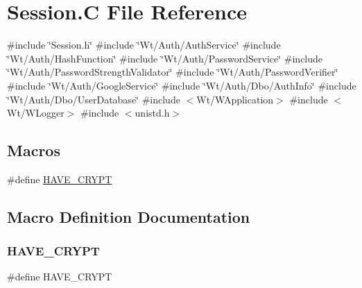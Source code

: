 \hypertarget{_session_8_c}{}\section{Session.\+C File Reference}
\label{_session_8_c}
{\ttfamily \#include \char`\"{}Session.\+h\char`\"{}}\newline
{\ttfamily \#include \char`\"{}Wt/\+Auth/\+Auth\+Service\char`\"{}}\newline
{\ttfamily \#include \char`\"{}Wt/\+Auth/\+Hash\+Function\char`\"{}}\newline
{\ttfamily \#include \char`\"{}Wt/\+Auth/\+Password\+Service\char`\"{}}\newline
{\ttfamily \#include \char`\"{}Wt/\+Auth/\+Password\+Strength\+Validator\char`\"{}}\newline
{\ttfamily \#include \char`\"{}Wt/\+Auth/\+Password\+Verifier\char`\"{}}\newline
{\ttfamily \#include \char`\"{}Wt/\+Auth/\+Google\+Service\char`\"{}}\newline
{\ttfamily \#include \char`\"{}Wt/\+Auth/\+Dbo/\+Auth\+Info\char`\"{}}\newline
{\ttfamily \#include \char`\"{}Wt/\+Auth/\+Dbo/\+User\+Database\char`\"{}}\newline
{\ttfamily \#include $<$Wt/\+W\+Application$>$}\newline
{\ttfamily \#include $<$Wt/\+W\+Logger$>$}\newline
{\ttfamily \#include $<$unistd.\+h$>$}\newline
\subsection*{Macros}
\begin{DoxyCompactItemize}
\item 
\#define \hyperlink{_session_8_c_acba86befdbaa214237a79fe6272ea219}{H\+A\+V\+E\+\_\+\+C\+R\+Y\+PT}
\end{DoxyCompactItemize}


\subsection{Macro Definition Documentation}
\mbox{\label{_session_8_c_acba86befdbaa214237a79fe6272ea219}} 
\subsubsection{\texorpdfstring{H\+A\+V\+E\+\_\+\+C\+R\+Y\+PT}{HAVE\_CRYPT}}
{\footnotesize\ttfamily \#define H\+A\+V\+E\+\_\+\+C\+R\+Y\+PT}


